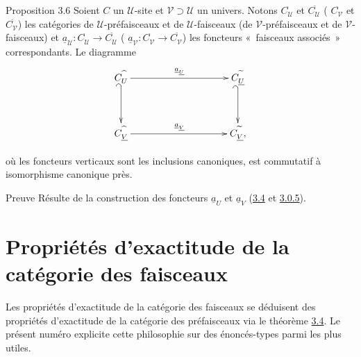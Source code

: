 \documentclass[10pt]{../fichiers-configuration-latex/smfart}
\begin{document}
\begin{enonce*}{Proposition 3.6}
Soient $C$ un $𝒰$-site et $𝒱\supset 𝒰$ un
univers. Notons $C^{\widehat{\phantom{,}}}_{𝒰}$ et
$C^{\widetilde{\phantom{,}}}_{𝒰}$ (\resp
$C^{\widehat{\phantom{,}}}_{𝒱}$ et
$C^{\widetilde{\phantom{,}}}_{𝒱}$) les catégories de
$𝒰$-préfaisceaux et de $𝒰$-faisceaux (\resp de
$𝒱$-préfaisceaux et de $𝒱$-faisceaux) et
$\underline{a}_{𝒰}:C^{\widehat{\phantom{,}}}_{𝒰}\rightarrow
C^{\widetilde{\phantom{,}}}_{𝒰}$ (\resp
$\underline{a}_{𝒱}:C^{\widehat{\phantom{,}}}_{𝒱}\rightarrow
C^{\widetilde{\phantom{,}}}_{𝒱}$) les foncteurs « faisceaux associés » correspondants. Le diagramme
\[
\xymatrix@C=3.5cm@R=1.25cm{ C^{\widehat{\phantom{a}}}_{U}
\ar[r]^{\underline{a}_{\underline{U}}}
\ar @{_{(}->}[d]& C^{\widetilde{\phantom{a}}}_{\underline{U}}\ar @{_{(}->}[d]\\
C^{\widehat{\phantom{a}}}_{\underline{V}}
\ar[r]^{\underline{a}_{\underline{V}}} &
C^{\widetilde{\phantom{a}}}_{\underline{V}} , }
\]

où les foncteurs verticaux sont les inclusions canoniques, est
commutatif à isomorphisme canonique près.
\end{enonce*}

\begin{enonce*}[remark]{Preuve}
Résulte de la construction des foncteurs $\underline{a}_U$ et
$\underline{a}_V$ (\hyperref[II.theo3.4]{3.4} et \hyperref[II.subsubsec3.0.5]{3.0.5}).
\end{enonce*}

\section{Propriétés d'exactitude de la catégorie des faisceaux}

Les propriétés d'exactitude de la catégorie des faisceaux se
déduisent des propriétés d'exactitude de la catégorie des
préfaisceaux via le théorème \hyperref[II.theo3.4]{3.4}. Le présent
numéro explicite cette philosophie sur des énoncés-types parmi
les plus utiles.
\end{document}
